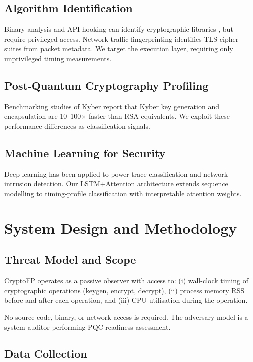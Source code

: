 \documentclass[conference]{IEEEtran}
\begin{document}
\subsection{Algorithm Identification}
Binary analysis and API hooking can identify cryptographic libraries
\cite{luk2005pin}, but require privileged access.
Network traffic fingerprinting \cite{anderson2017tls} identifies TLS
cipher suites from packet metadata.
We target the execution layer, requiring only unprivileged timing
measurements.

\subsection{Post-Quantum Cryptography Profiling}
Benchmarking studies of Kyber \cite{avanzi2022crystals} report that
Kyber key generation and encapsulation are 10--100$\times$ faster than
RSA equivalents.
We exploit these performance differences as classification signals.

\subsection{Machine Learning for Security}
Deep learning has been applied to power-trace classification
\cite{maghrebi2016breaking} and network intrusion detection.
Our LSTM+Attention architecture extends sequence modelling to
timing-profile classification with interpretable attention weights.

\section{System Design and Methodology}

\subsection{Threat Model and Scope}

CryptoFP operates as a passive observer with access to:
(i) wall-clock timing of cryptographic operations (keygen, encrypt, decrypt),
(ii) process memory RSS before and after each operation, and
(iii) CPU utilisation during the operation.

No source code, binary, or network access is required.
The adversary model is a system auditor performing PQC readiness assessment.

\subsection{Data Collection}
\end{document}

